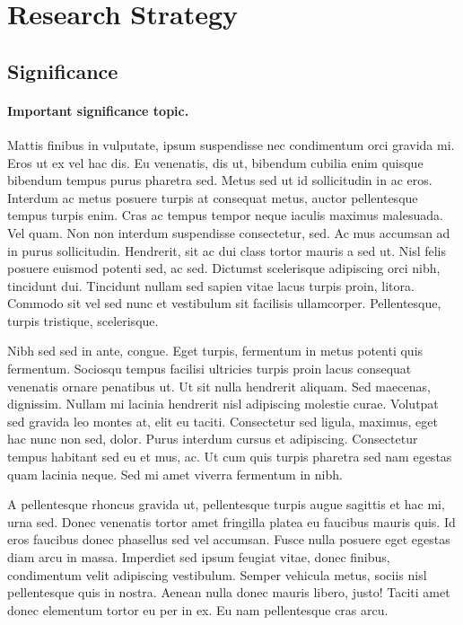 \documentclass[11pt,]{article}
\title{}
\author{}
\date{}
\let\oldparagraph\paragraph
\renewcommand{\paragraph}[1]{\oldparagraph{#1}\mbox{}}
\begin{document}
\hypertarget{research-strategy}{%
\section{Research Strategy}\label{research-strategy}}

\hypertarget{significance}{%
\subsection{Significance}\label{significance}}

\hypertarget{important-significance-topic.}{%
\paragraph{Important significance
topic.}\label{important-significance-topic.}}

Mattis finibus in vulputate, ipsum suspendisse nec condimentum orci
gravida mi. Eros ut ex vel hac dis. Eu venenatis, dis ut, bibendum
cubilia enim quisque bibendum tempus purus pharetra sed. Metus sed ut id
sollicitudin in ac eros. Interdum ac metus posuere turpis at consequat
metus, auctor pellentesque tempus turpis enim. Cras ac tempus tempor
neque iaculis maximus malesuada. Vel quam. Non non interdum suspendisse
consectetur, sed. Ac mus accumsan ad in purus sollicitudin. Hendrerit,
sit ac dui class tortor mauris a sed ut. Nisl felis posuere euismod
potenti sed, ac sed. Dictumst scelerisque adipiscing orci nibh,
tincidunt dui. Tincidunt nullam sed sapien vitae lacus turpis proin,
litora. Commodo sit vel sed nunc et vestibulum sit facilisis
ullamcorper. Pellentesque, turpis tristique, scelerisque.

Nibh sed sed in ante, congue. Eget turpis, fermentum in metus potenti
quis fermentum. Sociosqu tempus facilisi ultricies turpis proin lacus
consequat venenatis ornare penatibus ut. Ut sit nulla hendrerit aliquam.
Sed maecenas, dignissim. Nullam mi lacinia hendrerit nisl adipiscing
molestie curae. Volutpat sed gravida leo montes at, elit eu taciti.
Consectetur sed ligula, maximus, eget hac nunc non sed, dolor. Purus
interdum cursus et adipiscing. Consectetur tempus habitant sed eu et
mus, ac. Ut cum quis turpis pharetra sed nam egestas quam lacinia neque.
Sed mi amet viverra fermentum in nibh.

A pellentesque rhoncus gravida ut, pellentesque turpis augue sagittis et
hac mi, urna sed. Donec venenatis tortor amet fringilla platea eu
faucibus mauris quis. Id eros faucibus donec phasellus sed vel accumsan.
Fusce nulla posuere eget egestas diam arcu in massa. Imperdiet sed ipsum
feugiat vitae, donec finibus, condimentum velit adipiscing vestibulum.
Semper vehicula metus, sociis nisl pellentesque quis in nostra. Aenean
nulla donec mauris libero, justo! Taciti amet donec elementum tortor eu
per in ex. Eu nam pellentesque cras arcu.
\end{document}
